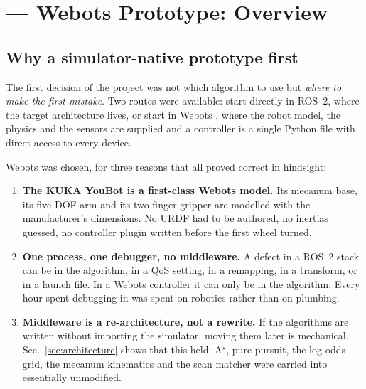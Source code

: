 \section{\phaseA{} --- Webots Prototype: Overview}
\label{sec:phaseA}

\subsection{Why a simulator-native prototype first}

The first decision of the project was not which algorithm to use but
\emph{where to make the first mistake}. Two routes were available:
start directly in ROS~2, where the target architecture lives, or start
in Webots \cite{michel2004webots}, where the robot model, the physics
and the sensors are supplied and a controller is a single Python file
with direct access to every device.

Webots was chosen, for three reasons that all proved correct in
hindsight:

\begin{enumerate}[leftmargin=*,itemsep=1pt,topsep=2pt]
  \item \textbf{The KUKA YouBot is a first-class Webots model.} Its
        mecanum base, its five-DOF arm and its two-finger gripper are
        modelled with the manufacturer's dimensions. No URDF had to be
        authored, no inertias guessed, no controller plugin written
        before the first wheel turned.
  \item \textbf{One process, one debugger, no middleware.} A defect in
        a ROS~2 stack can be in the algorithm, in a QoS setting, in a
        remapping, in a transform, or in a launch file. In a Webots
        controller it can only be in the algorithm. Every hour spent
        debugging in \phaseA{} was spent on robotics rather than on
        plumbing.
  \item \textbf{Middleware is a re-architecture, not a rewrite.} If the
        algorithms are written without importing the simulator, moving
        them later is mechanical. Sec.~\ref{sec:architecture} shows that
        this held: A$^\star$, pure pursuit, the log-odds grid, the
        mecanum kinematics and the scan matcher were carried into
        \phaseB{} essentially unmodified.
\end{enumerate}

